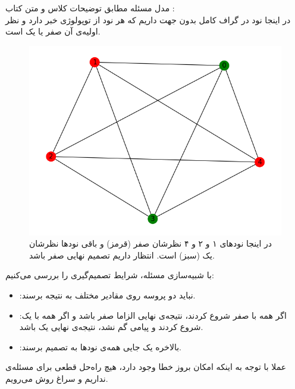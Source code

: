 \documentclass{article}
\begin{document}
\begin{multicols}{2}
مدل مسئله مطابق توضیحات کلاس و متن کتاب
:\\
در اینجا 
نود در گراف کامل بدون جهت داریم که هر نود از توپولوژی خبر دارد و نظر اولیه‌ی آن صفر یا یک است.
\begin{figure}[H]
    \centering
    \includegraphics[width=0.95\linewidth]{Photos/HW4/graph.png}
    \caption{
    در اینجا نودهای ۱ و ۲ و ۴ نظرشان صفر (قرمز) و باقی نودها نظرشان یک (سبز) است. انتظار داریم تصمیم نهایی صفر باشد.
    }
    \label{fig:my_label}
\end{figure}
با شبیه‌سازی مسئله، شرایط تصمیم‌گیری را بررسی می‌کنیم:
\begin{itemize}
    \item {}
    :نباید دو پروسه روی مقادیر مختلف به نتیجه برسند.
    \item {}
    :اگر همه با صفر شروع کردند، نتیجه‌ی نهایی الزاما صفر باشد و اگر همه با یک شروع کردند و پیامی گم نشد، نتیجه‌ی نهایی یک باشد.
    \item {}
    :بالاخره یک جایی همه‌ی نودها به تصمیم برسند.
\end{itemize}
عملا با توجه به اینکه امکان بروز خطا وجود دارد، هیچ راه‌حل قطعی برای مسئله‌ی 
نداریم و سراغ روش
می‌رویم.

\end{multicols}
\end{document}
